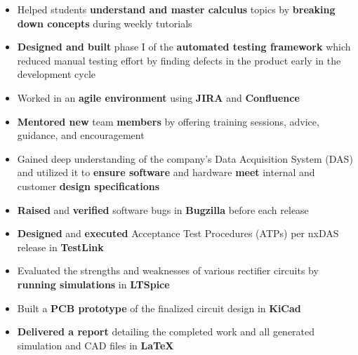 \documentclass[10pt,a4paper,ragged2e]{altacv}
\begin{document}
\divider

\begin{itemize}
\item Helped students {\bfseries understand and master calculus} topics by {\bfseries breaking down concepts} during weekly tutorials
\end{itemize}

\divider

\begin{itemize}
\item {\bfseries Designed and built} phase I of the {\bfseries automated testing framework} which reduced manual testing effort by finding defects in the product early in the development cycle
\item Worked in an {\bfseries agile environment} using {\bfseries JIRA} and {\bfseries Confluence}
\item {\bfseries Mentored new} team {\bfseries members} by offering training sessions, advice, guidance, and encouragement
\end{itemize}

\smallskip
\smallskip
\smallskip

\begin{itemize}
\item Gained deep understanding of the company's Data Acquisition System (DAS) and utilized it to {\bfseries ensure software} and hardware {\bfseries meet} internal and customer {\bfseries design specifications}
\item {\bfseries Raised} and {\bfseries verified} software bugs in {\bfseries Bugzilla} before each release
\item {\bfseries Designed} and {\bfseries executed} Acceptance Test Procedures (ATPs) per nxDAS release in {\bfseries TestLink}
\end{itemize}

\divider

\begin{itemize}
\item Evaluated the strengths and weaknesses of various rectifier circuits by {\bfseries running simulations} in {\bfseries LTSpice}
\item Built a {\bfseries PCB prototype} of the finalized circuit design in {\bfseries KiCad}
\item {\bfseries Delivered a report} detailing the completed work and all generated simulation and CAD files in {\bfseries \LaTeX}
\end{itemize}
\end{document}
